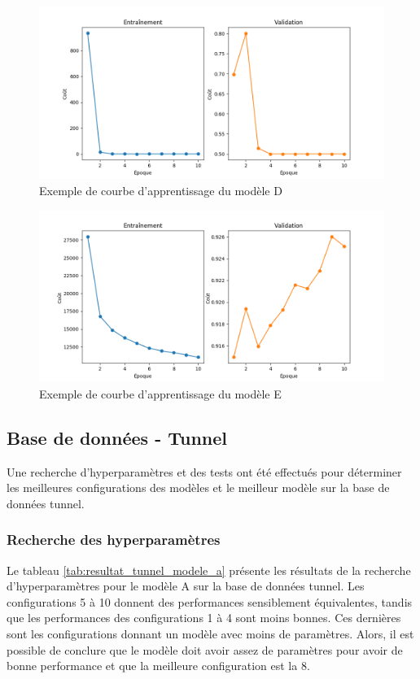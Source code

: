     \begin{figure}[H]
        \centering
        \includegraphics[width=16cm]{images/learning_curves_d.png}
        \caption{Exemple de courbe d'apprentissage du modèle D}
        \label{fig:learning_curves_d}
    \end{figure}

    \begin{figure}[H]
        \centering
        \includegraphics[width=16cm]{images/learning_curves_e.png}
        \caption{Exemple de courbe d'apprentissage du modèle E}
        \label{fig:learning_curves_e}
    \end{figure}

\subsection{Base de données - Tunnel}
    Une recherche d'hyperparamètres et des tests ont été effectués pour déterminer les meilleures configurations des modèles et le meilleur modèle sur la base de données tunnel.

\subsubsection{Recherche des hyperparamètres}
    Le tableau \ref{tab:resultat_tunnel_modele_a} présente les résultats de la recherche d'hyperparamètres pour le modèle A sur la base de données tunnel. Les configurations 5 à 10 donnent des performances sensiblement équivalentes, tandis que les performances des configurations 1 à 4 sont moins bonnes. Ces dernières sont les configurations donnant un modèle avec moins de paramètres. Alors, il est possible de conclure que le modèle doit avoir assez de paramètres pour avoir de bonne performance et que la meilleure configuration est la 8.
    
